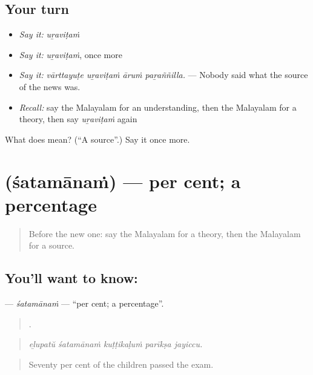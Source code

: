 \subsection*{Your turn}
\begin{itemize}
\raggedright
  \item \emph{Say it:} \emph{uṟaviṭaṁ}
  \item \emph{Say it:} \emph{uṟaviṭaṁ}, once more
  \item \emph{Say it:} \emph{vārttayuṭe uṟaviṭaṁ āruṁ paṟaññilla.} — Nobody said what the source of the news was.
  \item \emph{Recall:} say the Malayalam for an understanding, then the Malayalam for a theory, then say \emph{uṟaviṭaṁ} again
\end{itemize}

\begin{tcolorbox}[breakable,colback=teal!4,colframe=teal!35!black,title={Before you move on}]
What does  mean? (\textquotedblleft{}A source\textquotedblright{}.) Say it once more.
\end{tcolorbox}
\section[\texorpdfstring{\ml{ശതമാനം} (śatamānaṁ)}{ശതമാനം (śatamānaṁ)}]{ (śatamānaṁ) — per cent; a percentage}

\label{lesson:ML-C414-satamanam}



\begin{quote}
Before the new one: say the Malayalam for a theory, then the Malayalam for a source.
\end{quote}

\subsection*{You'll want to know: }
\textbf{} — \emph{śatamānaṁ} — \textquotedblleft{}per cent; a percentage\textquotedblright{}.

\begin{quote}
    .
\end{quote}

\begin{quote}
\emph{eḻupatŭ śatamānaṁ kuṭṭikaḷuṁ parīkṣa jayiccu.}
\end{quote}

\begin{quote}
Seventy per cent of the children passed the exam.
\end{quote}

